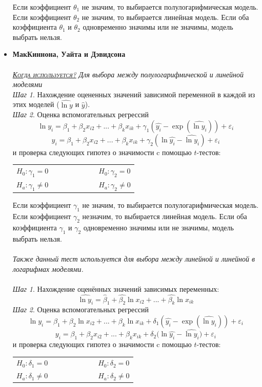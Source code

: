 \documentclass[a0,final]{a0poster}
\begin{document}
\begin{multicols}{4}
\begin{itemize}
Если коэффициент $\theta_1$ не значим, то выбирается полулогарифмическая модель. Если коэффициент $\theta_2$ не значим, то выбирается линейная модель. Если оба коэффициента $\theta_1$ и $\theta_2$ одновременно значимы или не значимы, модель выбрать нельзя.  \\
\item \textbf{МакКиннона, Уайта и Дэвидсона}\\
\\
\underline{\textsc{\textit{Когда используется?}}} \textit{Для выбора между полулогарифмической и линейной моделями}\\
\textit{Шаг 1}. Нахождение оцененных значений зависимой переменной в каждой из этих моделей ($\hat{\ln{y}}$ и $\hat{y}$).\\
\textit{Шаг 2}. Оценка вспомогательных регрессий
\[\ln{y_i} = {\beta}_1 + \beta_2x_{i2}+...+\beta_kx_{ik} + {\gamma}_1(\hat{y_i}-\exp{(\hat{\ln{y_i}})}) + \varepsilon_{i}\]
\[y_i ={\beta}_1 + \beta_2x_{i2}+...+\beta_kx_{ik} + {\gamma}_2(\ln{\hat{y_i}-\hat{\ln{y_i}}}) + \varepsilon_{i}\]
и проверка следующих гипотез о значимости c помощью $t$-тестов:
\begin{center}
\begin{tabular}{r  l}
$H_0: \gamma_1 = 0 \qquad \qquad \qquad$ &$H_0: \gamma_2 = 0$ \\
$H_a: \gamma_1 \ne 0 \qquad \qquad \qquad$&$H_a: \gamma_2 \ne 0$
\end{tabular}
\end{center}

Если коэффициент $\gamma_1$ не значим, то выбирается полулогарифмическая модель. Если коэффициент $\gamma_2$ незначим, то выбирается линейная модель. Если оба коэффициента $\gamma_1$ и $\gamma_2$ одновременно значимы или не значимы, модель выбрать нельзя.  \\
\\
\textit{Также данный тест используется для выбора между линейной и линейной в логарифмах моделями.}\\
\\
\textit{Шаг 1}. Нахождение оценённых значений зависимых переменных:$$\hat{\ln{y_i}} = \hat{\beta}_1 + \hat{\beta_2}\ln{x_{i2}}+...+\hat{\beta_k}\ln{x_{ik}}$$
\textit{Шаг 2}. Оценка вспомогательных регрессий
\[\ln{y_i} = {\beta}_1 + \beta_2\ln{x_{i2}}+...+\beta_k\ln{x_{ik}} + {\delta}_1(\hat{y_i}-\exp{(\hat{\ln{y_i}})}) + \varepsilon_i\]
\[y_i ={\beta}_1 + \beta_2x_{i2}+...+\beta_kx_{ik} + {\delta}_2(\ln{\hat{y_i}-\hat{\ln{y_i}})} + \varepsilon_i\]
и проверка следующих гипотез о значимости c помощью $t$-тестов:
\begin{center}
\begin{tabular}{r  l}
$H_0: \delta_1 = 0 \qquad \qquad \qquad$ &$H_0: \delta_2 = 0$ \\
$H_a: \delta_1 \ne 0 \qquad \qquad \qquad$&$H_a: \delta_2 \ne 0$
\end{tabular}
\end{center}


\end{itemize}
\end{multicols}
\end{document}
